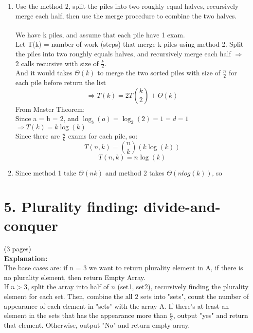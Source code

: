 \documentclass[11pt]{article}
\newenvironment{qparts}{\begin{enumerate}[{(}a{)}]}{\end{enumerate}}
\newcommand{\tab}{\hspace*{2em}}
\begin{document}
\begin{qparts}
\item %
Use the method 2, split the piles into two roughly equal halves, recursively merge each half, then use the merge procedure to combine the two halves.
\\
\\
We have k piles, and assume that each pile have 1 exam.\\
Let T(k) = number of work (steps) that merge k piles using method 2.
Split the piles into two roughly equals halves, and recursively merge each half $\Longrightarrow$ 2 calls recursive with size of $\frac{k}{2}$.\\
And it would takes $\Theta(k)$ to merge the two sorted piles with size of $\frac{n}{2}$ for each pile before return the list
$$\Longrightarrow T(k) = 2T(\frac{k}{2}) + \Theta(k)$$
From Master Theorem:\\
Since a = b = 2, and $\log_b(a) = \log_2(2) = 1 = d = 1$ 
$\Longrightarrow T(k) = k\log(k)$
\\
Since there are $\frac{n}{k}$ exams for each pile, so:
$$T(n,k) = (\frac{n}{k})(k\log(k))$$
$$\boxed{T(n,k) = n\log(k)}$$
\item %
Since method 1 take $\Theta(nk)$ and method 2 takes $\Theta(nlog(k))$, so 

\end{qparts}

\newpage
\section*{5. Plurality finding: divide-and-conquer} (3 pages)\\
\Large{}
\noindent
\textbf{Explanation:}\\
\tab The base cases are: if n = 3 we want to return plurality element in A, if there is no plurality element, then return Empty Array.
\\If $n > 3 $, split the array into half of $n$ (set1, set2), recursively finding the plurality element for each set. Then, combine the all 2 sets into "sets", count the number of appearance of each element in "sets" with the array A. If there's at least an element in the sets that has the appearance more than $\frac{n}{3}$, output "yes" and return that element. Otherwise, output "No" and return empty array.
\end{document}
